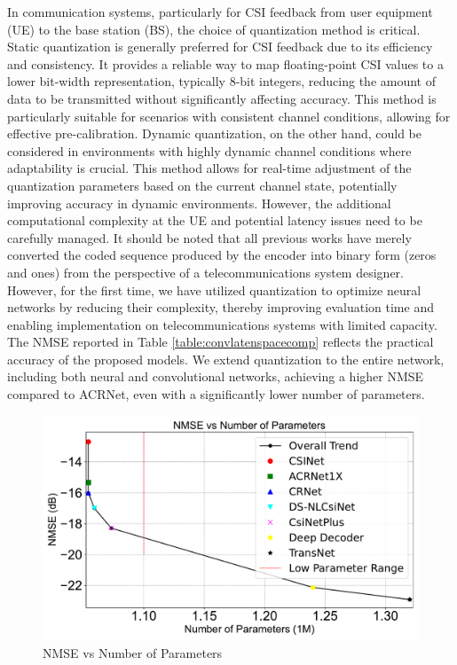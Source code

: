 \documentclass[lettersize,journal]{IEEEtran}
\begin{document}
In communication systems, particularly for CSI feedback from user equipment (UE) to the base station (BS), the choice of quantization method is critical. Static quantization is generally preferred for CSI feedback due to its efficiency and consistency. It provides a reliable way to map floating-point CSI values to a lower bit-width representation, typically 8-bit integers, reducing the amount of data to be transmitted without significantly affecting accuracy. This method is particularly suitable for scenarios with consistent channel conditions, allowing for effective pre-calibration.
Dynamic quantization, on the other hand, could be considered in environments with highly dynamic channel conditions where adaptability is crucial. This method allows for real-time adjustment of the quantization parameters based on the current channel state, potentially improving accuracy in dynamic environments. However, the additional computational complexity at the UE and potential latency issues need to be carefully managed.
It should be noted that all previous works have merely converted the coded sequence produced by the encoder into binary form (zeros and ones) from the perspective of a telecommunications system designer. However, for the first time, we have utilized quantization to optimize neural networks by reducing their complexity, thereby improving evaluation time and enabling implementation on telecommunications systems with limited capacity.
The NMSE reported in Table \ref{table:convlatenspacecomp} reflects the practical accuracy of the proposed models. We extend quantization to the entire network, including both neural and convolutional networks, achieving a higher NMSE compared to ACRNet, even with a significantly lower number of parameters.

\begin{figure}[!t]
	\centering
	\begin{minipage}[b]{0.45\textwidth}
		\centering
		\includegraphics[width=\textwidth]{NMSEvsNofparametters.pdf}
		\caption{NMSE vs Number of Parameters}
		\label{fig:nmse-params}
	\end{minipage}
	\hfill
	
\end{figure}
\end{document}
